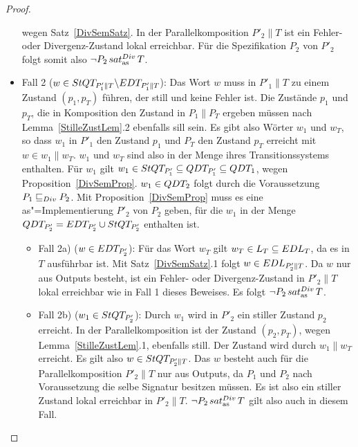 \begin{proof}
\begin{itemize}
      wegen Satz~\ref{DivSemSatz}. In der Parallelkomposition $P'_2\|T$ ist ein
      Fehler- oder Divergenz-Zustand lokal erreichbar. Für die Spezifikation
      $P_2$ von $P'_2$ folgt somit also $\neg P_2\hspace{0.05cm}sat_\mathrm{as}^{Div}\hspace{0.05cm} T$.
    \item Fall 2 ($w\in StQT _{P'_1\|T} \backslash EDT _{P'_1\|T}$): Das Wort
      $w$ muss in $P'_1\|T$ zu einem Zustand $(p_1,p_T)$ führen, der still und
      keine Fehler ist. Die Zustände $p_1$ und $p_T$, die in Komposition den
      Zustand in $P_1\|P_T$ ergeben müssen nach Lemma~\ref{StilleZustLem}.2
      ebenfalls sill sein. Es gibt also Wörter $w_1$ und $w_T$, so dass $w_1$
      in $P'_1$ den Zustand $p_1$ und $P_T$ den Zustand $p_T$ erreicht mit
      $w\in w_1\|w_T$. $w_1$ und $w_T$ sind also in der Menge \StQT{} ihres
      Transitionssystems enthalten. Für $w_1$ gilt $w_1\in StQT _{P'_1}
      \subseteq QDT _{P'_1}\subseteq QDT _1$, wegen
      Proposition~\ref{DivSemProp}. $w_1\in QDT _2$ folgt durch die
      Voraussetzung $P_1 \sqsubseteq  _{Div} P_2$. Mit Proposition~\ref{DivSemProp} muss es
      eine as"=Implementierung $P'_2$ von $P_2$ geben, für die $w_1$ in der
      Menge $QDT _{P'_2} = EDT _{P'_2} \cup StQT _{P'_2}$ enthalten ist.
      \begin{itemize}
        \item Fall 2a) ($w\in EDT _{P'_2}$): Für das Wort $w_T$ gilt $w_T\in L
          _T\subseteq EDL _T$, da es in $T$ ausführbar ist. Mit
          Satz~\ref{DivSemSatz}.1 folgt $w\in EDL _{P'_2\|T}$. Da $w$ nur aus
          Outputs besteht, ist ein Fehler- oder Divergenz-Zustand in $P'_2\|T$
          lokal erreichbar wie in Fall 1 dieses Beweises. Es folgt $\neg P_2
          \hspace{0.05cm}sat_\mathrm{as}^{Div}\hspace{0.05cm} T$.
        \item Fall 2b) ($w_1\in StQT _{P'_2}$): Durch $w_1$ wird in $P'_2$ ein
          stiller Zustand $p_2$ erreicht. In der Parallelkomposition ist der
          Zustand $(p_2,p_T)$, wegen Lemma~\ref{StilleZustLem}.1, ebenfalls
          still. Der Zustand wird durch $w_1\|w_T$ erreicht. Es gilt also
          $w\in StQT _{P'_2\|T}$. Das $w$ besteht auch für die
          Parallelkomposition $P'_2\|T$ nur aus Outputs, da $P_1$ und $P_2$
          nach Voraussetzung die selbe Signatur besitzen müssen. Es ist also
          ein stiller Zustand lokal erreichbar in $P'_2\|T$. $\neg P_2\hspace{0.05cm}sat_\mathrm{as}^{Div}\hspace{0.05cm}
          T$ gilt also auch in diesem Fall.
      \end{itemize}
  \end{itemize}
\end{proof}

